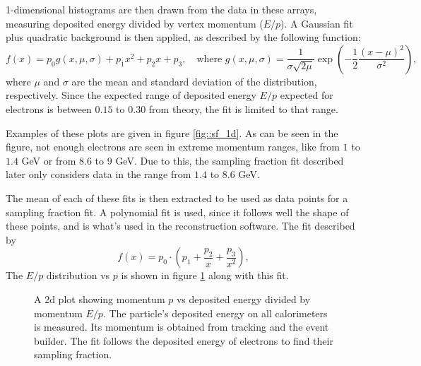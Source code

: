     1-dimensional histograms are then drawn from the data in these arrays, measuring deposited energy divided by vertex momentum ($E/p$).
    A Gaussian fit plus quadratic background is then applied, as described by the following function:
    \begin{equation*}
        f(x) = p_0 g(x, \mu, \sigma) + p_1 x^2 + p_2 x + p_3, \hspace{12pt}
        \text{where} \hspace{4pt}
        g(x, \mu, \sigma) = \frac{1}{\sigma \sqrt{2\mu}} \exp \left(-\frac{1}{2} \frac{(x - \mu)^2}{\sigma^2}\right),
    \end{equation*}
    where $\mu$ and $\sigma$ are the mean and standard deviation of the distribution, respectively.
    Since the expected range of deposited energy $E/p$ expected for electrons is between $0.15$ to $0.30$ from theory, the fit is limited to that range.

    Examples of these plots are given in figure \ref{fig::sf_1d}.
    As can be seen in the figure, not enough electrons are seen in extreme momentum ranges, like from $1$ to $1.4$ GeV or from $8.6$ to $9$ GeV.
    Due to this, the sampling fraction fit described later only considers data in the range from $1.4$ to $8.6$ GeV.

    The mean of each of these fits is then extracted to be used as data points for a sampling fraction fit.
    A polynomial fit is used, since it follows well the shape of these points, and is what's used in the reconstruction software.
    The fit described by
    \begin{equation*}
        f(x) = p_0 \cdot \left(p_1 + \frac{p_2}{x} + \frac{p_3}{x^2}\right),
    \end{equation*}
    The $E/p$ distribution vs $p$ is shown in figure \ref{fig::sf_2d} along with this fit.

    \begin{figure}[t!]
        \centering{}
        \caption[Calorimeters $p vs E/p$ plots]{A 2d plot showing momentum $p$ vs deposited energy divided by momentum $E/p$. The particle's deposited energy on all calorimeters is measured. Its momentum is obtained from tracking and the event builder. The fit follows the deposited energy of electrons to find their sampling fraction.}
        \label{fig::sf_2d}
    \end{figure}

